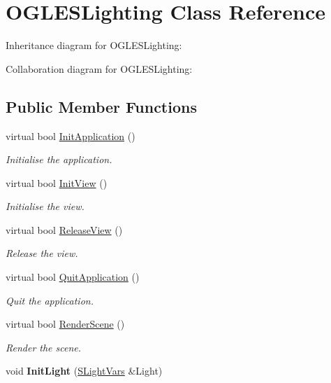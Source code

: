 \hypertarget{class_o_g_l_e_s_lighting}{\section{O\+G\+L\+E\+S\+Lighting Class Reference}
\label{class_o_g_l_e_s_lighting}
}


Inheritance diagram for O\+G\+L\+E\+S\+Lighting\+:


Collaboration diagram for O\+G\+L\+E\+S\+Lighting\+:
\subsection*{Public Member Functions}
\begin{DoxyCompactItemize}
\item 
virtual bool \hyperlink{class_o_g_l_e_s_lighting_acf8c50514db3aa3f73d98f4e46f28f07}{Init\+Application} ()
\begin{DoxyCompactList}\small\item\em Initialise the application. \end{DoxyCompactList}\item 
virtual bool \hyperlink{class_o_g_l_e_s_lighting_ac764f285084851acf77f7d692456cfdb}{Init\+View} ()
\begin{DoxyCompactList}\small\item\em Initialise the view. \end{DoxyCompactList}\item 
virtual bool \hyperlink{class_o_g_l_e_s_lighting_af4f04f602479cb511cb649bf3bd076a0}{Release\+View} ()
\begin{DoxyCompactList}\small\item\em Release the view. \end{DoxyCompactList}\item 
virtual bool \hyperlink{class_o_g_l_e_s_lighting_ac1ae9313e5fa8577305eb5ca2d6cf7d6}{Quit\+Application} ()
\begin{DoxyCompactList}\small\item\em Quit the application. \end{DoxyCompactList}\item 
virtual bool \hyperlink{class_o_g_l_e_s_lighting_a2f65411db538a52b3f81545834007b10}{Render\+Scene} ()
\begin{DoxyCompactList}\small\item\em Render the scene. \end{DoxyCompactList}\item 
\hypertarget{class_o_g_l_e_s_lighting_a95b5c6a87e779307f5c5983b4db8abb0}{void {\bfseries Init\+Light} (\hyperlink{struct_s_light_vars}{S\+Light\+Vars} \&Light)}\label{class_o_g_l_e_s_lighting_a95b5c6a87e779307f5c5983b4db8abb0}


\end{DoxyCompactItemize}
